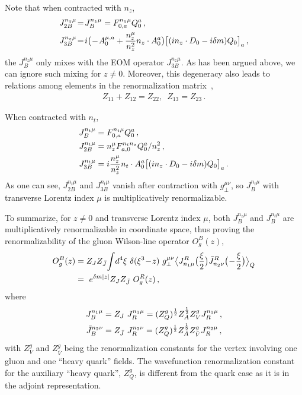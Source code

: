 \documentclass[aps,rmp,reprint,amsmath,amssymb,graphicx,longbibliography]{revtex4-1} %
\newcommand{\nn}{\nonumber}
\begin{document}
Note that when contracted with $n_z$,
\begin{align}
	J_{2B}^{n_z\mu}&\!=\! J_{B}^{n_z\mu} = F^{n_z\mu}_{0,a}Q_0^a\,,\\
	J_{3B}^{n_z\mu}&\!=\! i\big(\!-\!A^{\mu,a}_{0} + {n_z^\mu\over n_z^2} n_z\cdot A_0^a\big)\big[(in_z\cdot D_0-i\delta m)Q_0\big]_a\,,\nn
\end{align}
the $J_{B}^{n_z\mu}$ only mixes with the EOM operator $J_{3B}^{n_z\mu}$. As has been argued above, we can ignore such mixing for $z\neq0$.
Moreover, this degeneracy also leads to relations among elements in the renormalization matrix~\cite{Dorn:1986dt},
\begin{align}\label{eq:Zrelation}
	Z_{11}+Z_{12}=Z_{22}, \,\,\,  Z_{13}=Z_{23}\,.
\end{align}


When contracted with $n_t$,
\begin{align} \label{eq:gauxopt}
	J_{B}^{n_t\mu} &=F^{n_t\mu}_{0,a}Q_0^a\,,\nn\\
	J_{2B}^{n_t\mu} &=n_z^\mu F_{a,0}^{n_tn_z} Q_0^a/n_z^2\,,\nn\\
	J_{3B}^{n_t\mu}&= i{n_z^\mu\over n_z^2} n_t\cdot A_{0}^a \big[(in_z\cdot D_0-i\delta m)Q_0\big]_a\,.
\end{align}
As one can see, $J_{2B}^{n_t\mu}$ and $J_{3B}^{n_t\mu}$ vanish after contraction with $g_{\perp}^{\mu\nu}$, so $J_{B}^{n_t\mu}$ with transverse Lorentz index $\mu$ is multiplicatively renormalizable.

To summarize, for $z\neq0$ and transverse Lorentz index $\mu$, both $J_{B}^{n_z\mu}$ and $J_{B}^{n_t\mu}$ are multiplicatively renormalizable in coordinate space, thus proving the renormalizability of the gluon Wilson-line operator $O^B_g(z)$,
\begin{align} \label{eq:renproofgluon}
	O^B_g(z)&=Z_{J}Z_{\bar{J}}\!\int\! d^4\xi\ \delta(\xi^3\!-\!z)\ g_{\perp}^{\mu\nu}\big\langle J_{n_1\mu}^{R}\big({\xi\over2}\big)\bar{J}_{n_2\nu}^{R}\big(\!-\!{\xi\over2}\big)\big\rangle_Q\nn\\
	&=\ e^{\delta m|z|} Z_{J}Z_{\bar{J}}\ O^R_g(z)\,,
\end{align}
where
\begin{align}
	J_B^{n_1\mu}&=Z_{J}\ J_R^{n_1\mu}=(Z^g_Q)^{1\over 2}Z_A^{1\over 2}Z^g_V J_R^{n_1\mu}\,,\\
	\bar{J}_B^{n_2\nu}&=Z_{\bar{J}}\ J_R^{n_2\nu}=(Z^g_Q)^{1\over 2}Z_A^{1\over 2}Z^g_{\bar{V}} J_R^{n_2\mu}\,,
\end{align}
with $Z^g_V$ and $Z^g_{\bar{V}}$ being the renormalization constants for the vertex involving one gluon and one ``heavy quark'' fields. The wavefunction renormalization constant for the auxiliary ``heavy quark'', $Z^g_Q$, is different from the quark case as it is in the adjoint representation.
\end{document}
